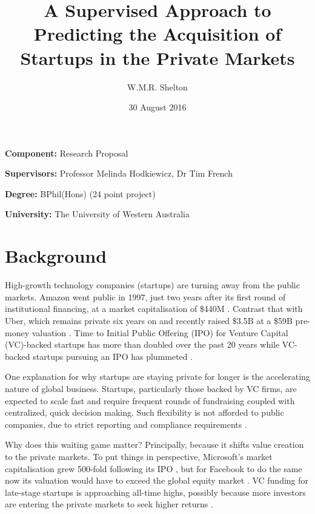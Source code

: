 \documentclass[12pt, a4paper]{article}
\title{A Supervised Approach to Predicting the Acquisition of Startups in the Private Markets}
\author{W.M.R. Shelton}
\date{30 August 2016}
\newcommand{\namelistlabel}[1]{\mbox{#1}\hfil}
\newenvironment{namelist}[1]{%
\begin{list}{}
    {
        \let\makelabel\namelistlabel
        \settowidth{\labelwidth}{#1}
        \setlength{\leftmargin}{1.1\labelwidth}
    }
  }{%
\end{list}}
\begin{document}
\maketitle

\begin{namelist}{xxxxxxxxxxxx}
\item[{\bf Component:}]
    Research Proposal
\item[{\bf Supervisors:}]
    Professor Melinda Hodkiewicz, Dr Tim French
\item[{\bf Degree:}]
    BPhil(Hons) (24 point project)
\item[{\bf University:}]
    The University of Western Australia
\end{namelist}

\section*{Background}

High-growth technology companies (startups) are turning away from the public markets. Amazon went public in 1997, just two years after its first round of institutional financing, at a market capitalisation of \$440M \cite{amazon}. Contrast that with Uber, which remains private six years on and recently raised \$3.5B at a \$59B pre-money valuation \cite{uber}. Time to Initial Public Offering (IPO) for Venture Capital (VC)-backed startups has more than doubled over the past 20 years while VC-backed startups pursuing an IPO has plummeted \cite{nvca2016}.

One explanation for why startups are staying private for longer is the accelerating nature of global business. Startups, particularly those backed by VC firms, are expected to scale fast and require frequent rounds of fundraising coupled with centralized, quick decision making. Such flexibility is not afforded to public companies, due to strict reporting and compliance requirements \cite{wies2015}.

Why does this waiting game matter? Principally, because it shifts value creation to the private markets. To put things in perspective, Microsoft’s market capitalisation grew 500-fold following its IPO \cite{microsoft}, but for Facebook to do the same now its valuation would have to exceed the global equity market \cite{facebook}. VC funding for late-stage startups is approaching all-time highs, possibly because more investors are entering the private markets to seek higher returns \cite{nvca2016}.
\end{document}
